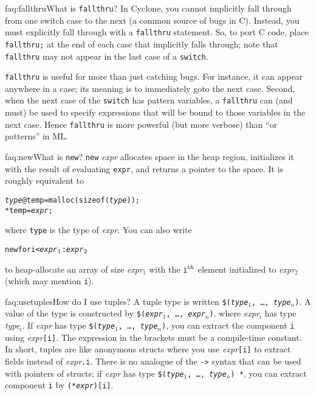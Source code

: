 \begin{faqa}{faq:fallthru}{What is \texttt{fallthru}?}
In Cyclone, you cannot implicitly fall through from one switch case to
the next (a common source of bugs in C).  Instead, you must explicitly
fall through with a \texttt{fallthru} statement.  So, to port C code,
place \texttt{fallthru;} at the end of each case that implicitly falls
through; note that \texttt{fallthru} may not appear in the last case
of a \texttt{switch}.

\texttt{fallthru} is useful for more than just catching bugs.  For
instance, it can appear anywhere in a case; its meaning is to
immediately goto the next case.  Second, when the next case of the
\texttt{switch} has pattern variables, a \texttt{fallthru} can (and
must) be used to specify expressions that will be bound to those
variables in the next case.  Hence \texttt{fallthru} is more powerful
(but more verbose) than ``or patterns'' in ML\@.
\end{faqa}

\begin{faqa}{faq:new}{What is \texttt{new}?}
\texttt{new} \textit{expr} allocates space in the heap region,
initializes it with the result of evaluating \texttt{expr}, and
returns a pointer to the space.  It is roughly equivalent to
\begin{alltt}
 \textit{type} @temp = malloc(sizeof(\textit{type}));
 *temp = \textit{expr};
\end{alltt}
where \texttt{type} is the type of \textit{expr}.  You can also write
\begin{alltt}
  new \lb for i < \textit{expr}\(\sb{1}\) : \textit{expr}\(\sb{2}\) \rb
\end{alltt}
to heap-allocate an array of size \textit{expr}$_1$ with the
\texttt{i}$^{\rm th}$ element initialized to \textit{expr}$_2$ (which
may mention \texttt{i}).
\end{faqa}

\begin{faqa}{faq:usetuples}{How do I use tuples?}
A tuple type is written
\texttt{\$(\textit{type}$_1$, \ldots, \textit{type}$_n$)}.
A value of the type is constructed by
\texttt{\$(\textit{expr}$_1$, \ldots, \textit{expr}$_n$)}.
where \textit{expr}$_i$ has type \textit{type}$_i$.  
If \textit{expr} has type
\texttt{\$(\textit{type}$_1$, \ldots, \textit{type}$_n$)},
you can extract the component \texttt{i} using
\textit{expr}\texttt{[i]}.
The expression in the brackets must be a compile-time constant.  In
short, tuples are like anonymous structs where you use
\textit{expr}\texttt{[i]} to extract fields instead of
\textit{expr}\texttt{.i}.
There is no analogue of the \texttt{->} syntax that can be used with
pointers of structs; if 
\textit{expr} has type
\texttt{\$(\textit{type}$_1$, \ldots, \textit{type}$_n$) *},
you can extract component \texttt{i} by \texttt{(*\textit{expr})[i]}.
\end{faqa}


